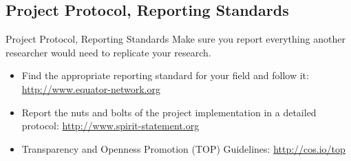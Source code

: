\documentclass{beamer}
\begin{document}
 { %
    \begin{frame}[plain, label=AEAreg]
     \end{frame}
}

\subsection*{Project Protocol, Reporting Standards}
\begin{frame}[<.->]{Project Protocol, Reporting Standards}
 Make sure you report everything another researcher would need to replicate your research.
 \begin{itemize}
 \item Find the appropriate reporting standard for your field and follow it: \url{http://www.equator-network.org}
\item Report the nuts and bolts of the project implementation in a detailed protocol: \url{http://www.spirit-statement.org}
\item Transparency and Openness Promotion (TOP) Guidelines: \url{http://cos.io/top}
\end{itemize}
\end{frame}

 { %
    \begin{frame}[plain, label=AEAreg]
     \end{frame}
}
\end{document}
